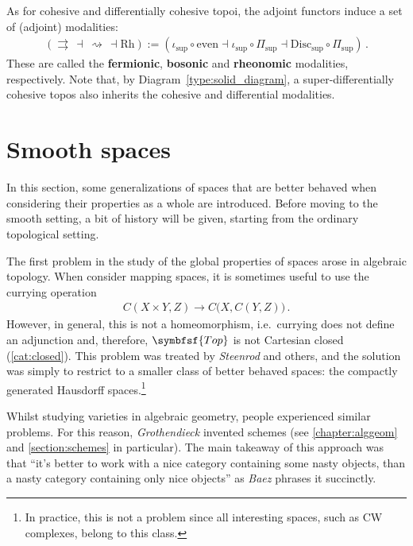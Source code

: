     \begin{property}
        As for cohesive and differentially cohesive topoi, the adjoint functors induce a set of (adjoint) modalities:
        \begin{gather}
            (\rightrightarrows\,\dashv\,\rightsquigarrow\,\dashv\mathrm{Rh}):=(\iota_{\text{sup}}\circ\mathrm{even}\dashv\iota_{\text{sup}}\circ\Pi_{\text{sup}}\dashv\mathrm{Disc}_{\text{sup}}\circ\Pi_{\text{sup}})\,.
        \end{gather}
        These are called the \textbf{fermionic}, \textbf{bosonic} and \textbf{rheonomic} modalities, respectively. Note that, by Diagram~\ref{type:solid_diagram}, a super-differentially cohesive topos also inherits the cohesive and differential modalities.
    \end{property}


\section{Smooth spaces}\label{section:smooth_spaces}

    In this section, some generalizations of spaces that are better behaved when considering their properties as a whole are introduced. Before moving to the smooth setting, a bit of history will be given, starting from the ordinary topological setting.

    The first problem in the study of the global properties of spaces arose in algebraic topology. When consider mapping spaces, it is sometimes useful to use the currying operation
    \begin{gather}
        C(X\times Y,Z)\rightarrow C\bigl(X,C(Y,Z)\bigr)\,.
    \end{gather}
    However, in general, this is not a homeomorphism, i.e.~currying does not define an adjunction and, therefore, $\symbfsf{Top}$ is not Cartesian closed (\cref{cat:closed}). This problem was treated by \textit{Steenrod} and others, and the solution was simply to restrict to a smaller class of better behaved spaces: the compactly generated Hausdorff spaces.\footnote{In practice, this is not a problem since all interesting spaces, such as CW complexes, belong to this class.}

    Whilst studying varieties in algebraic geometry, people experienced similar problems. For this reason, \textit{Grothendieck} invented schemes (see \cref{chapter:alggeom} and \cref{section:schemes} in particular). The main takeaway of this approach was that ``it's better to work with a nice category containing some nasty objects, than a nasty category containing only nice objects'' as \textit{Baez} phrases it succinctly.

